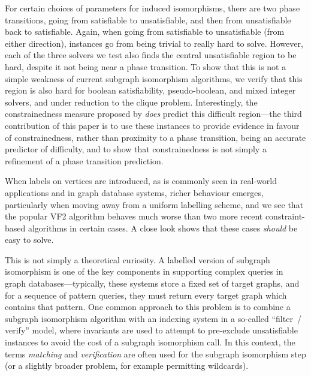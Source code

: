 \documentclass[twoside,11pt]{article}
\newcommand{\citet}[1]{\citeA{#1}}
\begin{document}
For certain choices of parameters for induced isomorphisms, there are two phase transitions, going
from satisfiable to unsatisfiable, and then from unsatisfiable back to satisfiable. Again, when
going from satisfiable to unsatisfiable (from either direction), instances go from being trivial to
really hard to solve. However, each of the three solvers we test also finds the central
unsatisfiable region to be hard, despite it not being near a phase transition. To show that this is
not a simple weakness of current subgraph isomorphism algorithms, we verify that this region is also
hard for boolean satisfiability, pseudo-boolean, and mixed integer solvers, and under reduction to
the clique problem. Interestingly, the constrainedness measure proposed by
\citet{DBLP:conf/aaai/GentMPW96} \emph{does} predict this difficult region---the third contribution
of this paper is to use these instances to provide evidence in favour of constrainedness, rather
than proximity to a phase transition, being an accurate predictor of difficulty, and to show that
constrainedness is not simply a refinement of a phase transition prediction.


When labels on vertices are introduced, as is commonly seen in real-world applications and in graph
database systems, richer behaviour emerges, particularly when moving away from a uniform labelling
scheme, and we see that the popular VF2 algorithm behaves much worse than two more recent
constraint-based algorithms in certain cases.  A close look shows that these cases \emph{should} be
easy to solve.

This is not simply a theoretical curiosity. A labelled version of subgraph isomorphism is one of
the key components in supporting complex queries in graph databases---typically, these systems store
a fixed set of target graphs, and for a sequence of pattern queries, they must return every target
graph which contains that pattern.  One common approach to this problem is to combine a subgraph
isomorphism algorithm with an indexing system in a so-called ``filter~/ verify'' model, where
invariants are used to attempt to pre-exclude unsatisfiable instances to avoid the cost of a
subgraph isomorphism call. In this context, the terms \emph{matching} and \emph{verification} are
often used for the subgraph isomorphism step (or a slightly broader problem, for example permitting
wildcards).
\end{document}
